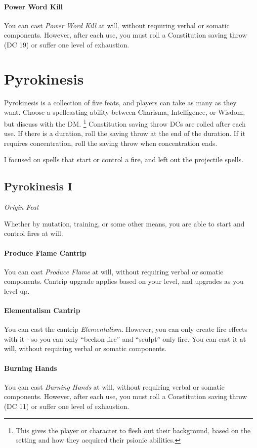\documentclass[twocolumn]{dndbook}
\begin{document}
\paragraph*{Power Word Kill} You can cast \emph{Power Word Kill} at will,
without requiring verbal or somatic components. However, after each use, you must roll a Constitution saving throw (DC 19) or suffer one level of exhaustion.

\section{Pyrokinesis}

Pyrokinesis is a collection of five feats, and players can take as many as they want.
Choose a spellcasting ability between Charisma, Intelligence, or Wisdom, but discuss with the DM.
\footnote{This gives the player or character to flesh out their background, based on the setting and how they acquired their psionic abilities.}
Constitution saving throw DCs are rolled after each use.
If there is a duration, roll the saving throw at the end of the duration.
If it requires concentration, roll the saving throw when concentration ends.\par

I focused on spells that start or control a fire, and left out the projectile spells.

\subsection{Pyrokinesis I}
{\emph{Origin Feat}}\par
Whether by mutation, training, or some other means, you are able to start and control fires at will.
\paragraph*{Produce Flame Cantrip} You can cast \emph{Produce Flame} at will,
without requiring verbal or somatic components. Cantrip upgrade applies based on your level, and upgrades as you level up.
\paragraph*{Elementalism Cantrip} You can cast the cantrip \emph{Elementalism}.
However, you can only create fire effects with it - so you can only ``beckon fire'' and ``sculpt'' only fire.
You can cast it at will, without requiring verbal or somatic components.
\paragraph*{Burning Hands} You can cast \emph{Burning Hands} at will,
without requiring verbal or somatic components. However, after each use, you must roll a Constitution saving throw (DC 11) or suffer one level of exhaustion.
\end{document}
